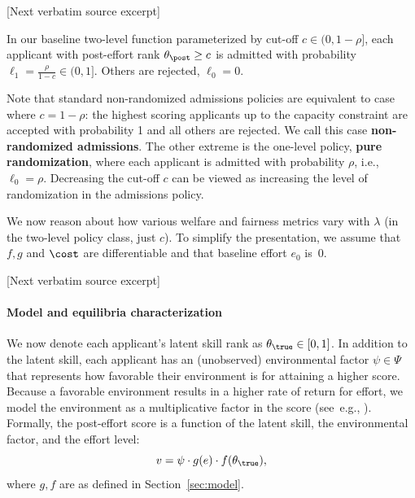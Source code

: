 \documentclass[10pt]{article}
\begin{document}
\begin{ReviewVerbatim}
{[Next verbatim source excerpt]

\begin{definition}\label{assump:2-level-fixed-cap} In our baseline two-level function parameterized by cut-off $c \in (0,1-\rho]$, each applicant with post-effort rank  $\theta_\post \geq c$ is admitted with probability $\ell_1 =\frac{\rho}{1-c} \in (0,1]$. Others are rejected, $\ell_0 = 0$.
\end{definition}

Note that standard non-randomized admissions policies are equivalent to case where $c = 1 - \rho$: the highest scoring applicants up to the capacity constraint are accepted with probability 1 and all others are rejected. We call this case \textbf{non-randomized admissions}. The other extreme is the one-level policy, \textbf{pure randomization}, where each applicant is admitted with probability ${\rho}$, i.e., $\ell_0 =\rho$. Decreasing the cut-off $c$ can be viewed as increasing the level of randomization in the admissions policy.


{We now reason about how various welfare and fairness metrics vary with $\lambda$ (in the two-level policy class, just $c$). To simplify the presentation, we assume that $f, g$ and $\cost$ are differentiable and that baseline effort $e_0$ is~$0$.}

[Next verbatim source excerpt]

\paragraph{Model and equilibria characterization} We now denote each applicant's latent skill rank as $\theta_\true \in [0,1]$. In addition to the latent skill, each applicant has an (unobserved) environmental factor $\psi \in \Psi$ that represents how favorable their environment is for attaining a higher score. Because a favorable environment results in a higher rate of return for effort, we model the environment as a multiplicative factor in the score (see~e.g., \citet{calsamiglia09decent}). Formally, the post-effort score is a function of the latent skill, the environmental factor, and the effort level:
\begin{equation*}\label{eq:env-score}
v = \psi \cdot  g(e)\cdot f(\theta_\true),
\end{equation*}
where $g, f$ are as defined in Section~\ref{sec:model}. %


}
\end{ReviewVerbatim}
\end{document}
